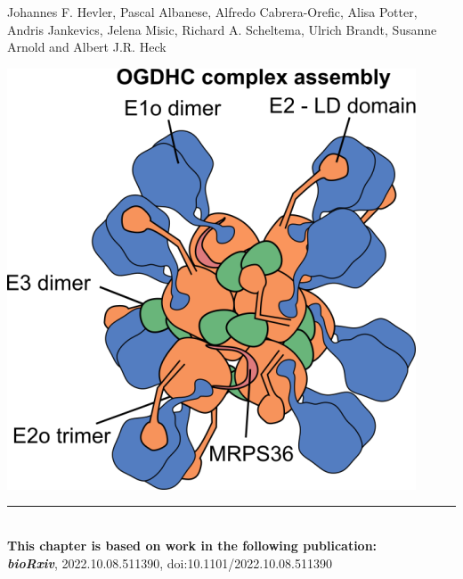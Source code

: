  \label{ch-5}
\vspace*{0.25cm}

\footnotesize Johannes F. Hevler, Pascal Albanese, Alfredo Cabrera-Orefic, Alisa Potter, Andris Jankevics, Jelena Misic, Richard A. Scheltema, Ulrich Brandt, Susanne Arnold and Albert J.R. Heck
%
\begin{center}
    \vspace{3cm}
    \includegraphics[]{Chapter.5/Figures/OGDHC_schematic.png}
    \vspace{0.25cm}
\end{center}
%
\begin{flushleft}
    \vspace*{\fill}
    \rule{\textwidth}{1pt}\\[0cm]
    \textbf{This chapter is based on work in the following publication:}\\
    \footnotesize
    \textbf{\emph{bioRxiv}}, 2022.10.08.511390, doi:10.1101/2022.10.08.511390
\end{flushleft}
%
